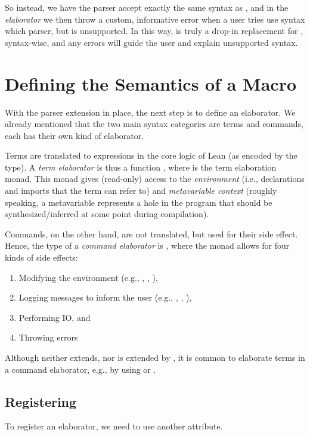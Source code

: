 So instead, we have the parser accept exactly the same syntax as \inductive{}, and in the \emph{elaborator} we then throw a custom, informative error when a user tries use syntax which parser, but is unsupported.
In this way, \data{} is truly a drop-in replacement for \inductive{}, syntax-wise, and any errors will guide the user and explain unsupported syntax.



\section{Defining the Semantics of a Macro}
With the parser extension in place, the next step is to define an elaborator.
We already mentioned that the two main syntax categories are terms and commands, each has their own kind of elaborator.

Terms are translated to expressions in the core logic of Lean (as encoded by the  type). A \emph{term elaborator} is thus a function , where  is the term elaboration monad. This monad gives (read-only) access to the \emph{environment} (i.e., declarations and imports that the term can refer to) and \emph{metavariable context} (roughly speaking, a metavariable represents a hole in the program that should be synthesized/inferred at some point during compilation).


Commands, on the other hand, are not translated, but used for their side effect. Hence, the type of a \emph{command elaborator} is , where the  monad allows for four kinds of side effects: 
\begin{enumerate}
    \item Modifying the environment (e.g., \inductive{}, , ),
    \item Logging messages to inform the user (e.g., , , ),
    \item Performing IO, and
    \item Throwing errors
\end{enumerate}

Although  neither extends, nor is extended by , it is common to elaborate terms in a command elaborator, e.g., by using  or .


\subsection*{Registering}
To register an elaborator, we need to use another attribute.

